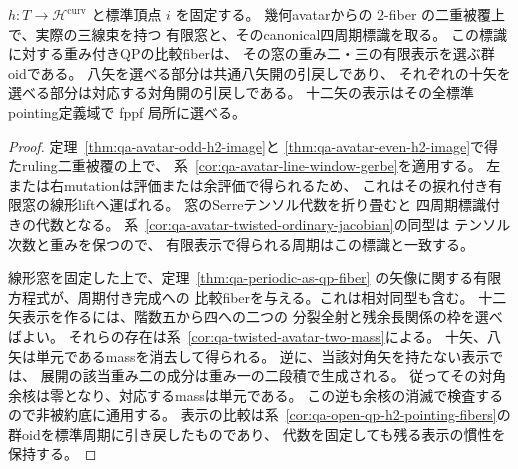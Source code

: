 \begin{corollary}
\label{cor:qa-avatar-qp-over-geometric-h2}
$h:T\to\mathcal H^{\mathrm{curv}}$ と標準頂点 $i$ を固定する。
幾何avatarからの $2$-fiber の二重被覆上で、実際の三線束を持つ
有限窓と、そのcanonical四周期標識を取る。
この標識に対する重み付きQPの比較fiberは、
その窓の重み二・三の有限表示を選ぶ群oidである。
八矢を選べる部分は共通八矢開の引戻しであり、
それぞれの十矢を選べる部分は対応する対角開の引戻しである。
十二矢の表示はその全標準pointing定義域で fppf 局所に選べる。
\end{corollary}
\begin{proof}
定理~\ref{thm:qa-avatar-odd-h2-image}と
\ref{thm:qa-avatar-even-h2-image}で得たruling二重被覆の上で、
系~\ref{cor:qa-avatar-line-window-gerbe}を適用する。
左または右mutationは評価または余評価で得られるため、
これはその捩れ付き有限窓の線形liftへ運ばれる。
窓のSerreテンソル代数を折り畳むと
四周期標識付きの代数となる。
系~\ref{cor:qa-avatar-twisted-ordinary-jacobian}の同型は
テンソル次数と重みを保つので、
有限表示で得られる周期はこの標識と一致する。

線形窓を固定した上で、定理~\ref{thm:qa-periodic-as-qp-fiber}
の矢像に関する有限方程式が、周期付き完成への
比較fiberを与える。これは相対同型も含む。
十二矢表示を作るには、階数五から四への二つの
分裂全射と残余長関係の枠を選べばよい。
それらの存在は系~\ref{cor:qa-twisted-avatar-two-mass}による。
十矢、八矢は単元であるmassを消去して得られる。
逆に、当該対角矢を持たない表示では、
展開の該当重み二の成分は重み一の二段積で生成される。
従ってその対角余核は零となり、対応するmassは単元である。
この逆も余核の消滅で検査するので非被約底に通用する。
表示の比較は系~\ref{cor:qa-open-qp-h2-pointing-fibers}の
群oidを標準周期に引き戻したものであり、
代数を固定しても残る表示の慣性を保持する。
\end{proof}

